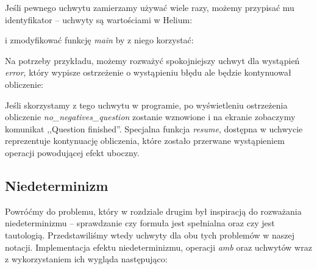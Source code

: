 Jeśli pewnego uchwytu zamierzamy używać wiele razy, możemy przypisać mu identyfikator -- uchwyty są wartościami w Helium:




i zmodyfikować funkcję \textit{main} by z niego korzystać:




Na potrzeby przykładu, możemy rozważyć spokojniejszy uchwyt dla wystąpień \textit{error}, który wypisze ostrzeżenie o wystąpieniu błędu ale będzie kontynuował obliczenie:




Jeśli skorzystamy z tego uchwytu w programie, po wyświetleniu ostrzeżenia obliczenie \textit{no\_negatives\_question} zostanie wznowione i na ekranie zobaczymy komunikat ,,Question finished''. Specjalna funkcja \textit{resume}, dostępna w uchwycie reprezentuje kontynuację obliczenia, które zostało przerwane wystąpieniem operacji powodującej efekt uboczny.

\subsection{Niedeterminizm}

Powróćmy do problemu, który w rozdziale drugim był inspiracją do rozważania niedeterminizmu -- sprawdzanie czy formuła jest spełnialna oraz czy jest tautologią. Przedstawiliśmy wtedy uchwyty dla obu tych problemów w naszej notacji. Implementacja efektu niedeterminizmu, operacji \textit{amb} oraz uchwytów wraz z wykorzystaniem ich wygląda następująco:

